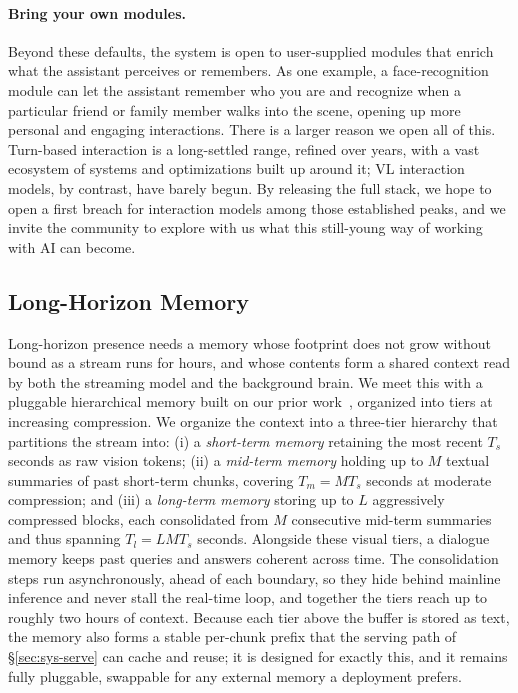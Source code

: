 \paragraph{\textbf{Bring your own modules.}} Beyond these defaults, the system is open to user-supplied modules that enrich what the assistant perceives or remembers. As one example, a face-recognition module can let the assistant remember who you are and recognize when a particular friend or family member walks into the scene, opening up more personal and engaging interactions. There is a larger reason we open all of this. Turn-based interaction is a long-settled range, refined over years, with a vast ecosystem of systems and optimizations built up around it; VL interaction models, by contrast, have barely begun. By releasing the full stack, we hope to open a first breach for interaction models among those established peaks, and we invite the community to explore with us what this still-young way of working with AI can become.


\subsection{Long-Horizon Memory}\label{sec:sys-mem}
Long-horizon presence needs a memory whose footprint does not grow without bound as a stream runs for hours, and whose contents form a shared context read by both the streaming model and the background brain. We meet this with a pluggable hierarchical memory built on our prior work~\cite{yao2026harnessingstreamingvideowild}, organized into tiers at increasing compression.
We organize the context into a three-tier hierarchy that partitions the stream into: (i) a \textit{short-term memory} retaining the most recent $T_s$ seconds as raw vision tokens; (ii) a \textit{mid-term memory} holding up to $M$ textual summaries of past short-term chunks, covering $T_m = M T_s$ seconds at moderate compression; and (iii) a \textit{long-term memory} storing up to $L$ aggressively compressed blocks, each consolidated from $M$ consecutive mid-term summaries and thus spanning $T_l = L M T_s$ seconds.
Alongside these visual tiers, a dialogue memory keeps past queries and answers coherent across time. The consolidation steps run asynchronously, ahead of each boundary, so they hide behind mainline inference and never stall the real-time loop, and together the tiers reach up to roughly two hours of context. Because each tier above the buffer is stored as text, the memory also forms a stable per-chunk prefix that the serving path of §\ref{sec:sys-serve} can cache and reuse; it is designed for exactly this, and it remains fully pluggable, swappable for any external memory a deployment prefers.


